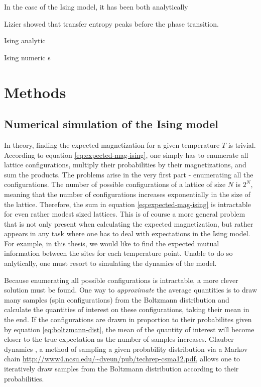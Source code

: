 \documentclass[12pt]{article}
\begin{document}
In the case of the Ising model, it has been both analytically 

Lizier showed that transfer entropy peaks before the phase transition. \cite{barnett-ising}

Ising analytic \cite{mi-ising-analytic}

Ising numeric \cite{mi-ising-numeric}s

\newpage
\section{Methods}

\subsection{Numerical simulation of the Ising model}

In theory, finding the expected magnetization for a given temperature $T$ is trivial. According to equation \ref{eq:expected-mag-ising}, one simply has to enumerate all lattice configurations, multiply their probabilities by their magnetizations, and sum the products. The problems arise in the very first part - enumerating all the configurations. The number of possible configurations of a lattice of size $N$ is $2^N$, meaning that the number of configurations increases exponentially in the size of the lattice. Therefore, the sum in equation \ref{eq:expected-mag-ising} is intractable for even rather modest sized lattices. This is of course a more general problem that is not only present when calculating the expected magnetization, but rather appears in any task where one has to deal with expectations in the Ising model. For example, in this thesis, we would like to find the expected mutual information between the sites for each temperature point. Unable to do so anlytically, one must resort to simulating the dynamics of the model. 

Because enumerating all possible configurations is intractable, a more clever solution must be found. One way to \textit{approximate} the average quantities is to draw many samples (spin configurations) from the Boltzmann distribution and calculate the quantities of interest on these configurations, taking their mean in the end. If the configurations are drawn in proportion to their probabilites given by equation \ref{eq:boltzmann-dist}, the mean of the quantity of interest will become closer to the true expectation as the number of samples increases. Glauber dynamics \cite{metropolis}, a method of sampling a given probability distribution via a Markov chain \url{http://www4.ncsu.edu/~dyeun/pub/techrep-csma12.pdf}, allows one to iteratively draw samples from the Boltzmann distribution according to their probabilities.
\end{document}
